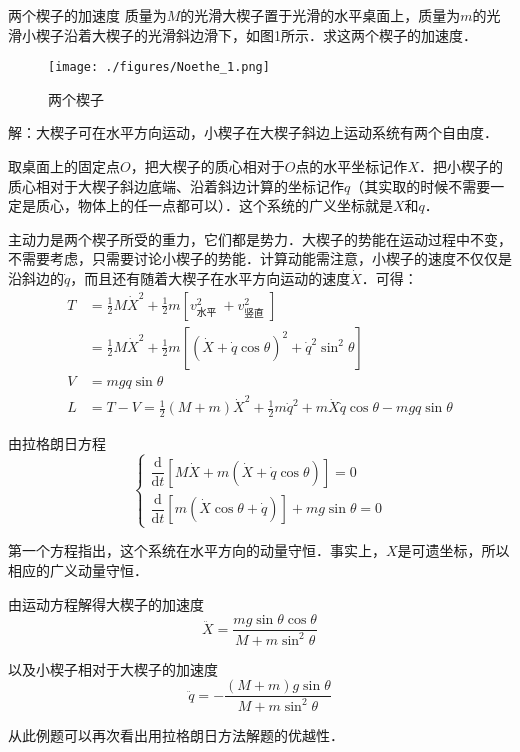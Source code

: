 \begin{example}{两个楔子的加速度}
质量为$M $的光滑大楔子置于光滑的水平桌面上，质量为$m$的光滑小楔子沿着大楔子的光滑斜边滑下，如图1所示．求这两个楔子的加速度．
\begin{figure}[ht]
\centering
\texttt{[image: ./figures/Noethe\_1.png]}
\caption{两个楔子} \label{Noethe_fig1}
\end{figure}

解：大楔子可在水平方向运动，小楔子在大楔子斜边上运动系统有两个自由度．

取桌面上的固定点$O$，把大楔子的质心相对于$O$点的水平坐标记作$X $．把小楔子的质心相对于大楔子斜边底端、沿着斜边计算的坐标记作$q$（其实取的时候不需要一定是质心，物体上的任一点都可以）．这个系统的广义坐标就是$X $和$q $．

主动力是两个楔子所受的重力，它们都是势力．大楔子的势能在运动过程中不变，不需要考虑，只需要讨论小楔子的势能．计算动能需注意，小楔子的速度不仅仅是沿斜边的$\dot q$，而且还有随着大楔子在水平方向运动的速度$\dot X$．可得：
\begin{equation}
\begin{aligned} T &=\frac{1}{2} M \dot{X}^{2}+\frac{1}{2} m\left[v_{\text {水平 }}^{2}+v_{\text {竖直 }}^{2}\right] \\ &=\frac{1}{2} M \dot{X}^{2}+\frac{1}{2} m\left[(\dot{X}+\dot{q} \cos \theta)^{2}+\dot{q}^{2} \sin ^{2} \theta\right] \\ V &=m g q \sin \theta \\ L &=T-V=\frac{1}{2}(M+m) \dot{X}^{2}+\frac{1}{2} m \dot{q}^{2}+m \dot{X} \dot{q} \cos \theta-m g q \sin \theta \end{aligned}
\end{equation}

由拉格朗日方程
\begin{equation}
\begin{cases}
\dfrac{\mathrm{d}}{\mathrm{d} t}[M \dot{X}+m(\dot{X}+\dot{q} \cos \theta)]=0 \\ \dfrac{\mathrm{d}}{\mathrm{d} t}[m(\dot{X} \cos \theta+\dot{q})]+m g \sin \theta=0
\end{cases}
\end{equation}

第一个方程指出，这个系统在水平方向的动量守恒．事实上，$X$是可遗坐标，所以相应的广义动量守恒．

由运动方程解得大楔子的加速度
\begin{equation}
\ddot{X}=\frac{m g \sin \theta \cos \theta}{M+m \sin ^{2} \theta}
\end{equation}

以及小楔子相对于大楔子的加速度
\begin{equation}
\ddot{q}=-\frac{(M+m) g \sin \theta}{M+m \sin ^{2} \theta}
\end{equation}

\end{example}
从此例题可以再次看出用拉格朗日方法解题的优越性．


